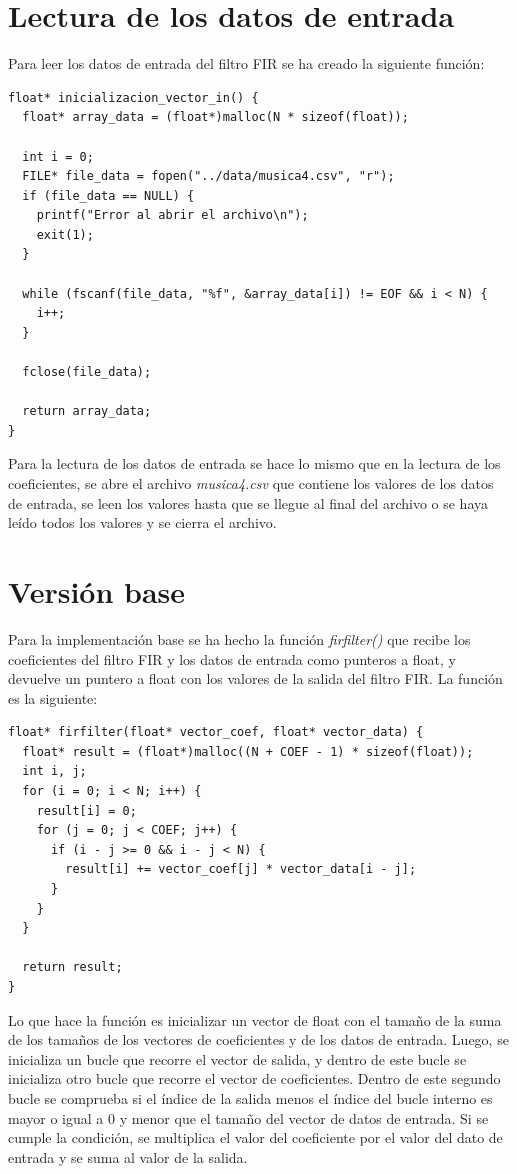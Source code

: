 \documentclass[11pt]{report}
\begin{document}
\section*{Lectura de los datos de entrada}
Para leer los datos de entrada del filtro FIR se ha creado la siguiente función:
\begin{lstlisting}
float* inicializacion_vector_in() {
  float* array_data = (float*)malloc(N * sizeof(float));

  int i = 0;
  FILE* file_data = fopen("../data/musica4.csv", "r");
  if (file_data == NULL) {
    printf("Error al abrir el archivo\n");
    exit(1);
  }

  while (fscanf(file_data, "%f", &array_data[i]) != EOF && i < N) {
    i++;
  }

  fclose(file_data);

  return array_data;
}
\end{lstlisting}

Para la lectura de los datos de entrada se hace lo mismo que en la lectura de los coeficientes, se abre el archivo \emph{musica4.csv} que contiene
los valores de los datos de entrada, se leen los valores hasta que se llegue al final del archivo o se haya leído todos los valores y se cierra el archivo.

\newpage

\section{Versión base}
Para la implementación base se ha hecho la función \emph{firfilter()} que recibe los coeficientes del filtro FIR y los datos de entrada como punteros a float,
y devuelve un puntero a float con los valores de la salida del filtro FIR. La función es la siguiente:

\begin{lstlisting}
float* firfilter(float* vector_coef, float* vector_data) {
  float* result = (float*)malloc((N + COEF - 1) * sizeof(float));
  int i, j;
  for (i = 0; i < N; i++) {
    result[i] = 0;
    for (j = 0; j < COEF; j++) {
      if (i - j >= 0 && i - j < N) {
        result[i] += vector_coef[j] * vector_data[i - j];
      }
    }
  }

  return result;
}
\end{lstlisting}

Lo que hace la función es inicializar un vector de float con el tamaño de la suma de los tamaños de los vectores de coeficientes y de los datos de entrada.
Luego, se inicializa un bucle que recorre el vector de salida, y dentro de este bucle se inicializa otro bucle que recorre el vector de coeficientes.
Dentro de este segundo bucle se comprueba si el índice de la salida menos el índice del bucle interno es mayor o igual a 0 y menor que el tamaño del vector de datos de entrada.
Si se cumple la condición, se multiplica el valor del coeficiente por el valor del dato de entrada y se suma al valor de la salida.
\end{document}
